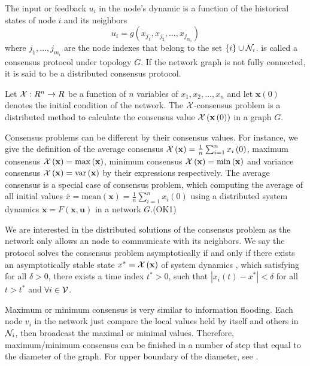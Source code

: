 The input or feedback $u_{i}$ in the node's dynamic is a function
of the historical states of node $i$ and its neighbors
\begin{equation}
u_{i}=g\left(x_{j_{1}},x_{j_{2}},\ldots,x_{j_{m_{i}}}\right)\label{eq:consensus protocol}
\end{equation}
where $j_{1},\ldots,j_{m_{i}}$ are the node indexes that belong to
the set $\left\{ i\right\} \cup{\cal N}_{i}$. 
is called a consensus protocol under topology $G$. If the network
graph is not fully connected, it is said to be a distributed consensus
protocol. 
\begin{defn}
Let ${\cal X}:R^{n}\to R$ be a function of $n$ variables of $x_{1},x_{2},\ldots,x_{n}$
and let $\mathbf{x}\left(0\right)$ denotes the initial condition
of the network. The ${\cal X}$-consensus problem is a distributed
method to calculate the consensus value ${\cal X}\left(\mathbf{x}\left(0\right)\right)$
in a graph $G$. 
\end{defn}
Consensus problems can be different by their consensus values. For
instance, we give the definition of the average consensus ${\cal X}\left(\mathbf{x}\right)=\frac{1}{n}\sum_{i=1}^{n}x_{i}\left(0\right)$,
maximum consensus ${\cal X}\left(\mathbf{x}\right)=\max\left(\mathbf{x}\right)$,
minimum consensus ${\cal X}\left(\mathbf{x}\right)=\min\left(\mathbf{x}\right)$
and variance consensus ${\cal X}\left(\mathbf{x}\right)=\mbox{var}\left(\mathbf{x}\right)$
by their expressions respectively. The average consensus is a special
case of consensus problem, which computing the average of all initial
values $\overline{x}=\mbox{mean}\left(\mathbf{x}\right)=\frac{1}{n}\sum_{i=1}^{n}x_{i}\left(0\right)$
using a distributed system dynamics $\mathbf{\dot{x}}=F\left(\mathbf{x},\mathbf{u}\right)$
in a network $G$.(OK1)

We are interested in the distributed solutions of the consensus problem
as the network only allows an node to communicate with its neighbors.
We say the protocol  solves the
consensus problem asymptotically if and only if there exists an asymptotically
stable state $x^{*}={\cal X}\left(\mathbf{x}\right)$ of system dynamics
, which satisfying for all $\delta>0$,
there exists a time index $t^{*}>0$, such that $\left|x_{i}(t)-x^{*}\right|<\delta$
for all $t>t^{*}$ and $\forall i\in{\cal V}$.

Maximum or minimum consensus is very similar to information flooding.
Each node $v_{i}$ in the network just compare the local values held
by itself and others in ${\cal N}_{i}$, then broadcast the maximal
or minimal values. Therefore, maximum/minimum consensus can be finished
in a number of step that equal to the diameter of the graph. For upper
boundary of the diameter, see \cite{Russell1994}.

